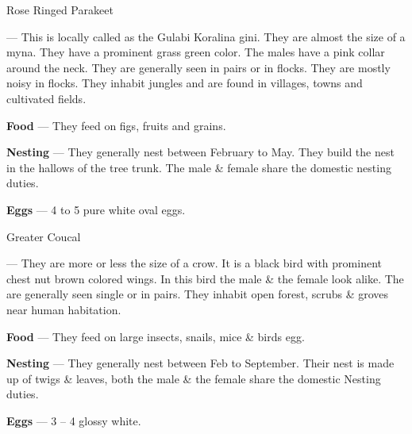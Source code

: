 \begin{bird}{Rose Ringed Parakeet}

 --- This is locally called as the Gulabi Koralina gini. They are almost the size of a myna. They have a prominent grass green color. The males have a pink collar around the neck. They are generally seen in pairs or in flocks. They are mostly noisy in flocks. They inhabit 
jungles and are found in villages, towns and cultivated fields.

{\large\bf Food} --- They feed on figs, fruits and grains. 

{\large\bf Nesting} --- They generally nest between February to May. They build the nest in the hallows of the tree trunk. The male \& female share the domestic nesting duties.

{\large\bf Eggs} --- 4 to 5 pure white oval eggs.
\end{bird}

\begin{bird}{Greater Coucal}

 --- They are more or less the size of a crow. It is a black bird with prominent chest nut brown colored wings. In this bird the male \& the female look alike. The are generally seen single or in pairs. They inhabit open forest, scrubs \& groves near human habitation. 

{\large\bf Food} --- They feed on large insects, snails, mice \& birds egg.

{\large\bf Nesting} --- They generally nest between Feb to September. Their nest is made up of twigs \& leaves, both the male \& the female share the domestic Nesting duties.

{\large\bf Eggs} --- 3 -- 4 glossy white.
\end{bird}

